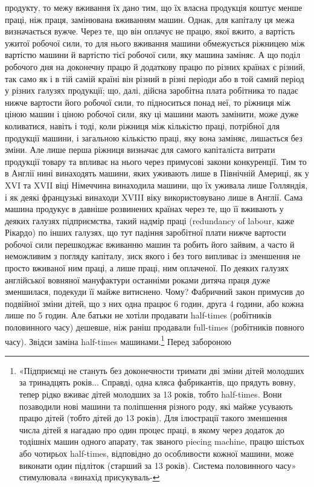 \parcont{}  %
продукту, то межу вживання їх дано тим, що їх власна продукція
коштує менше праці, ніж праця, замінювана вживанням машин.
Однак, для капіталу ця межа визначається вужче. Через те, що
він оплачує не працю, якої вжито, а вартість ужитої робочої
сили, то для нього вживання машини обмежується ріжницею
між вартістю машини й вартістю тієї робочої сили, яку машина
заміняє. А що поділ робочого дня на доконечну працю й додаткову
працю по різних країнах є різний, так само як і в тій самій
країні він різний в різні періоди або в той самий період у різних
галузях продукції; що, далі, дійсна заробітна плата робітника
то падає нижче вартости його робочої сили, то підноситься понад
неї, то ріжниця між ціною машин і ціною робочої сили, яку ці
машини мають замінити, може дуже коливатися, навіть і тоді,
коли ріжниця між кількістю праці, потрібної для продукції
машини, і загальною кількістю праці, яку вона заміняє, лишається
без зміни.  Але лише перша ріжниця визначає для самого
капіталіста витрати продукції товару та впливає на нього через
примусові закони конкуренції. Тим то в Англії нині винаходять
машини, яких уживають лише в Північній Америці, як у XVI
та XVII віці Німеччина винаходила машини, що їх уживала
лише Голляндія, і як деякі французькі винаходи XVIII віку
використовувано лише в Англії. Сама машина продукує в давніше
розвинених країнах через те, що її вживають у деяких галузях
підприємства, такий надмір праці (redundancy of labour, каже
Рікардо) по інших галузях, що тут падіння заробітної плати нижче
вартости робочої сили перешкоджає вживанню машин та робить
його зайвим, а часто й неможливим з погляду капіталу, зиск
якого і без того випливає із зменшення не просто вживаної ним
праці, а лише праці, ним оплаченої. По деяких галузях англійської
вовняної мануфактури останніми роками дитяча праця дуже
зменшилася, подекуди її майже витиснено. Чому? Фабричний
закон примусив до подвійної зміни дітей, що з них одна працює
6 годин, друга 4 години, або кожна лише по 5 годин. Але батьки
не хотіли продавати half-times (робітників половинного часу)
дешевше, ніж раніш продавали full-times (робітників повного
часу). Звідси заміна half-times машинами.\footnote{
«Підприємці не стануть без доконечности тримати дві зміни дітей
молодших за тринадцять років... Справді, одна кляса фабрикантів, що
прядуть вовну, тепер рідко вживає дітей молодших за 13 років, тобто
half-times. Вони позаводили нові машини та поліпшення різного роду,
які майже усувають працю дітей (тобто дітей до 13 років). Для ілюстрації
такого зменшення числа дітей я нагадаю про один процес праці, в якому
через додаток до тодішніх машин одного апарату, так званого piecing
machine, працю шістьох або чотирьох half-times, відповідно до особливости
кожної машини, може виконати один підліток (старший за
13 років). Система половинного часу» стимулювала «винахід присукуваль-
} Перед забороною
